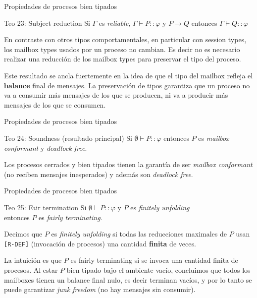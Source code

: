 \documentclass{beamer}
\begin{document}
\begin{frame}{Propiedades de procesos bien tipados}
    \begin{block}{Teo 23: Subject reduction}
        Si $\Gamma$ es \emph{reliable}, $\Gamma \vdash P :: \varphi$ y $P \rightarrow Q$ entonces $\Gamma \vdash Q :: \varphi$
    \end{block}
    \vspace{1em}

    En contraste con otros tipos comportamentales, en particular con session types, los mailbox types usados por un proceso no cambian. Es decir no es necesario realizar una reducción de los mailbox types para preservar el tipo del proceso.
    \vspace{1em}

    Este resultado se ancla fuertemente en la idea de que el tipo del mailbox refleja el \textbf{balance} final de mensajes. La preservación de tipos garantiza que un proceso no va a consumir más mensajes de los que se producen, ni va a producir más mensajes de los que se consumen.
\end{frame}

\begin{frame}{Propiedades de procesos bien tipados}
    \begin{block}{Teo 24: Soundness (resultado principal)}
        Si $\emptyset \vdash P :: \varphi$ entonces $P$ es \emph{mailbox conformant} y \emph{deadlock free}.
    \end{block}
    \vspace{1em}

    Los procesos cerrados y bien tipados tienen la garantía de ser \emph{mailbox conformant} (no reciben mensajes inesperados) y además son \emph{deadlock free}.
\end{frame}

\begin{frame}{Propiedades de procesos bien tipados}
    \begin{block}{Teo 25: Fair termination}
        Si $\emptyset \vdash P :: \varphi$ y $P$ es \emph{finitely unfolding}
        \\ entonces $P$ es \emph{fairly terminating}.
    \end{block}
    \vspace{1em}

    Decimos que $P$ es \emph{finitely unfolding} si todas las reducciones maximales de $P$ usan \texttt{[R-DEF]} (invocación de procesos) una cantidad \textbf{finita} de veces.
    \vspace{1em}

    La intuición es que $P$ es fairly terminating si se invoca una cantidad finita de procesos. Al estar $P$ bien tipado bajo el ambiente vacío, concluimos que todos los mailboxes tienen un balance final nulo, es decir terminan vacíos, y por lo tanto se puede garantizar \emph{junk freedom} (no hay mensajes sin consumir).
\end{frame}
\end{document}
